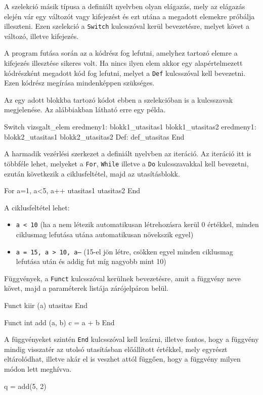 A szelekció másik típusa a definiált nyelvben olyan elágazás, mely az elágazás elején vár egy változót vagy kifejezést és ezt utána a megadott elemekre próbálja illeszteni. Ezen szelekció a \texttt{Switch} kulcsszóval kerül bevezetésre, melyet követ a változó, illetve kifejezés.

A program futása során az a kódrész fog lefutni, amelyhez tartozó elemre a kifejezés illesztése sikeres volt. Ha nincs ilyen elem akkor egy alapértelmezett kódrészként megadott kód fog lefutni, melyet a \texttt{Def} kulcsszóval kell bevezetni. Ezen kódrész megírása mindenképpen szükséges.

Az egy adott blokkba tartozó kódot ebben a szelekcióban is a kulcsszavak megjelenése. Az alábbiakban látható erre egy példa.
\begin{cpp}
Switch vizsgalt_elem
	eredmeny1:
		blokk1_utasitas1
		blokk1_utasitas2
	eredmeny1:
		blokk2_utasitas1
		blokk2_utasitas2
	Def:
		def_utasitas
End
\end{cpp}

A harmadik vezérlési szerkezet a definiált nyelvben az iteráció. Az iteráció itt is többféle lehet, melyeket a \texttt{For}, \texttt{While} illetve a \texttt{Do} kulcsszavakkal kell bevezetni, ezután következik a ciklusfeltétel, majd az utasításblokk.
\begin{cpp}
For a=1, a<5, a++
	utasitas1
	utasitas2
End
\end{cpp}

A ciklusfeltétel lehet:
\begin{itemize}
    \item  \texttt{a < 10} (ha a nem létezik automatikusan létrehozásra kerül 0 értékkel, minden ciklusmag lefutása utána automatikusan növekszik egyel)
    \item \texttt{a = 15, a > 10, a--} (15-el jön létre, csökken egyel minden ciklusmag lefutása után és addig fut míg nagyobb mint 10)
\end{itemize}

Függvények, a \texttt{Funct} kulcsszóval kerülnek bevezetésre, amit a függvény neve követ, majd a paraméterek listája zárójelpáron belül.
\begin{cpp}
Funct kiir (a)
	utasitas
End

Funct int add (a, b)
	c = a + b
End
\end{cpp}

A függvényeket szintén \texttt{End} kulcsszóval kell lezárni, illetve fontos, hogy a függvény mindig visszatér az utolsó utasításban előállított értékkel, mely egyrészt eltárolódhat, illetve akár el is veszhet attól függően, hogy a függvény milyen módon lett meghívva.
\begin{cpp}
q = add(5, 2)
\end{cpp}

